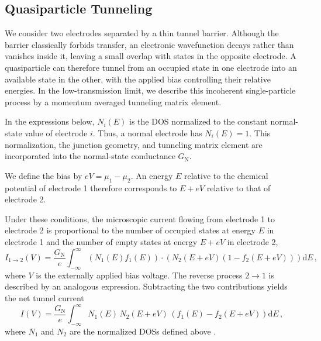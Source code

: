     \subsection{Quasiparticle Tunneling}
    \label{subsec:micro:tunnel-current}

        We consider two electrodes separated by a thin tunnel barrier. Although the barrier classically forbids transfer, an electronic wavefunction decays rather than vanishes inside it, leaving a small overlap with states in the opposite electrode. A quasiparticle can therefore tunnel from an occupied state in one electrode into an available state in the other, with the applied bias controlling their relative energies. In the low-transmission limit, we describe this incoherent single-particle process by a momentum averaged tunneling matrix element. \cite{bardeen_tunnelling_1961,giaever_electron_1960,giaever_study_1961}

        In the expressions below, $N_i(E)$ is the DOS normalized to the constant normal-state value of electrode $i$. Thus, a normal electrode has $N_i(E)=1$. This normalization, the junction geometry, and tunneling matrix element are incorporated into the normal-state conductance $G_\mathrm{N}$.

        We define the bias by $eV=\mu_1-\mu_2$. An energy $E$ relative to the chemical potential of electrode 1 therefore corresponds to $E+eV$ relative to that of electrode 2.

        Under these conditions, the microscopic current flowing from electrode 1 to electrode 2 is proportional to the number of occupied states at energy $E$ in electrode 1 and the number of empty states at energy $E+eV$ in electrode 2,
        \begin{equation}
            I_{1\to2}(V)  = \frac{G_\mathrm{N}}{e} \int_{-\infty}^\infty \left(N_1(E) f_1(E) \right)\cdot \left(N_2(E+eV)\left(1-f_2(E+eV)\right)\right)\mathrm{d}E\,,
            \label{eq:micro:tunnel-1to2}
        \end{equation}
        where $V$ is the externally applied bias voltage. The reverse process $2\to1$ is described by an analogous expression. Subtracting the two contributions yields the net tunnel current
        \begin{equation}
            I(V) = \frac{G_\mathrm{N}}{e} \int_{-\infty}^\infty N_1(E)\, N_2(E+eV)\, \left(f_1(E)-f_2(E+eV)\right)\mathrm{d}E\,,
            \label{eq:micro:tunnel}
        \end{equation}
        where $N_1$ and $N_2$ are the normalized DOSs defined above \cite{bardeen_tunnelling_1961,giaever_study_1961}.

